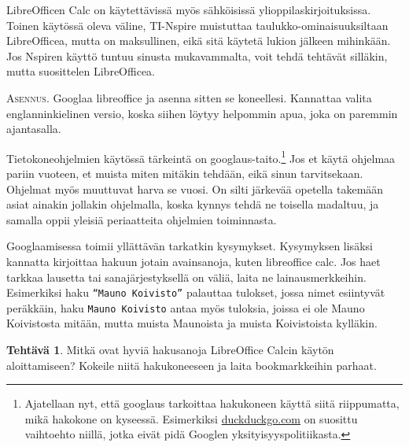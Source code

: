 \documentclass[12pt,leqno,a4paper,oneside]{amsart}
\theoremstyle{definition}
\newtheorem{exercise}{Tehtävä}
\theoremstyle{remark}
\numberwithin{equation}{section}
\begin{document}
LibreOfficen Calc on käytettävissä myös sähköisissä ylioppilaskirjoituksissa. Toinen käytössä oleva väline, TI-Nspire muistuttaa taulukko-ominaisuuksiltaan
LibreOfficea, mutta on maksullinen, eikä sitä käytetä lukion jälkeen mihinkään. Jos Nspiren käyttö tuntuu sinusta mukavammalta, voit 
tehdä tehtävät silläkin, mutta suosittelen LibreOfficea. 

\textsc{Asennus.} Googlaa libreoffice ja asenna sitten se koneellesi. Kannattaa valita englanninkielinen versio, koska siihen löytyy helpommin apua, joka
on paremmin ajantasalla.

Tietokoneohjelmien käytössä tärkeintä on googlaus-taito.\footnote{Ajatellaan nyt, että googlaus tarkoittaa hakukoneen käyttä siitä riippumatta, mikä
hakokone on kyseessä. Esimerkiksi \url{duckduckgo.com} on suosittu vaihtoehto niillä, jotka eivät pidä Googlen yksityisyyspolitiikasta.} Jos et käytä
ohjelmaa pariin vuoteen, et muista miten mitäkin tehdään, eikä sinun tarvitsekaan. Ohjelmat myös muuttuvat harva se vuosi. On silti järkevää opetella 
takemään asiat ainakin jollakin ohjelmalla, koska kynnys tehdä ne toisella madaltuu, ja samalla oppii yleisiä periaatteita ohjelmien toiminnasta.

Googlaamisessa toimii yllättävän tarkatkin kysymykset. Kysymyksen lisäksi kannatta kirjoittaa hakuun jotain avainsanoja, kuten libreoffice calc. Jos 
haet tarkkaa lausetta tai sanajärjestyksellä on väliä, laita ne lainausmerkkeihin. Esimerkiksi haku \texttt{``Mauno Koivisto''} palauttaa tulokset, jossa
nimet esiintyvät peräkkäin, haku \texttt{Mauno Koivisto} antaa myös tuloksia, joissa ei ole Mauno Koivistosta mitään, mutta muista Maunoista ja muista 
Koivistoista kylläkin.

\begin{exercise}
 Mitkä ovat hyviä hakusanoja LibreOffice Calcin käytön aloittamiseen? Kokeile niitä hakukoneeseen ja laita bookmarkkeihin parhaat.
\end{exercise}
\end{document}
